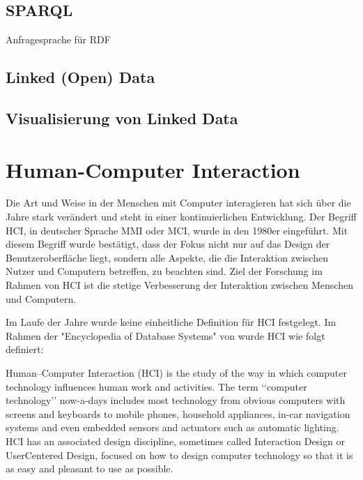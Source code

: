 \subsection{SPARQL} 

Anfragesprache für RDF

\subsection{Linked (Open) Data}

\subsection{Visualisierung von Linked Data} 

\section{Human-Computer Interaction}\label{sec:ux}

Die Art und Weise in der Menschen mit Computer interagieren hat sich über die Jahre stark verändert und steht in einer kontinuierlichen Entwicklung. 
Der Begriff  \ac{HCI}, in deutscher Sprache \ac{MMI} oder \ac{MCI}, wurde in den 1980er eingeführt.
Mit diesem Begriff wurde bestätigt, dass der Fokus nicht nur auf das Design der Benutzeroberfläche liegt, sondern alle Aspekte, die die Interaktion zwischen Nutzer und Computern betreffen, zu beachten sind. \citep[vgl.]{preece_human-computer_1995}
Ziel der Forschung im Rahmen von \ac{HCI} ist die stetige Verbesserung der Interaktion zwischen Menschen und Computern. \newline

\noindent Im Laufe der Jahre wurde keine einheitliche Definition für \ac{HCI} festgelegt.
Im Rahmen der "Encyclopedia of Database Systems" von \citet{dix_human-computer_2009} wurde \ac{HCI} wie folgt definiert:
\begin{definition}
  Human–Computer Interaction (HCI) is the study of the way in which computer technology influences human work and activities. 
  The term ‘‘computer technology’’ now-a-days includes most technology from obvious computers with screens and keyboards to mobile phones, household appliances, in-car navigation
  systems and even embedded sensors and actuators such as automatic lighting. 
  HCI has an associated design discipline, sometimes called Interaction Design or UserCentered Design, focused on how to design computer technology so that it is as easy and
  pleasant to use as possible.
\end{definition}

